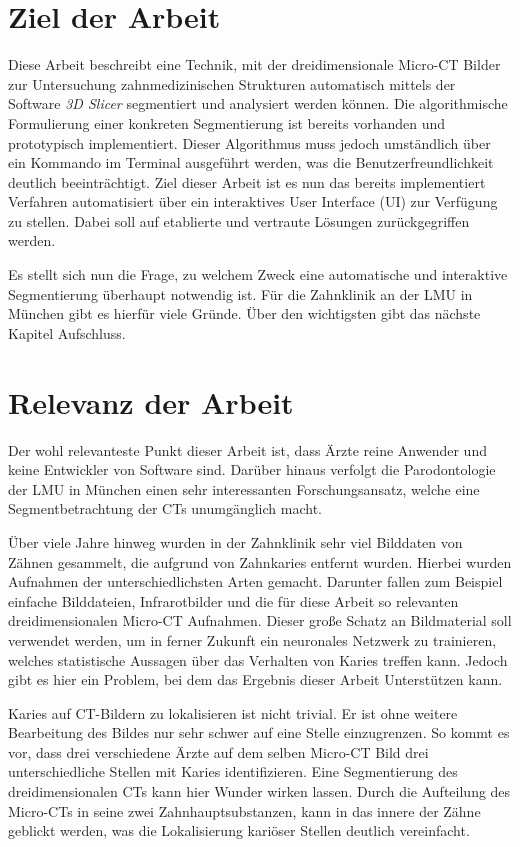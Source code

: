 \section{Ziel der Arbeit}
\label{sec:ziel_der_arbeit} Diese Arbeit beschreibt eine Technik, mit der
dreidimensionale Micro-CT Bilder zur Untersuchung zahnmedizinischen Strukturen
automatisch mittels der Software \textit{3D Slicer} segmentiert und analysiert werden
können. Die algorithmische Formulierung einer konkreten Segmentierung ist
bereits vorhanden und prototypisch implementiert. Dieser Algorithmus muss jedoch
umständlich über ein Kommando im Terminal ausgeführt werden, was die
Benutzerfreundlichkeit deutlich beeinträchtigt. Ziel dieser Arbeit ist es nun das
bereits implementiert Verfahren automatisiert über ein interaktives User Interface
(UI) zur Verfügung zu stellen. Dabei soll auf etablierte und vertraute Lösungen
zurückgegriffen werden.

Es stellt sich nun die Frage, zu welchem Zweck eine automatische und interaktive
Segmentierung überhaupt notwendig ist. Für die Zahnklinik an der LMU in München
gibt es hierfür viele Gründe. Über den wichtigsten gibt das nächste Kapitel Aufschluss.

\section{Relevanz der Arbeit}
\label{sec:relevanz_der_arbeit} Der wohl relevanteste Punkt dieser Arbeit ist,
dass Ärzte reine Anwender und keine Entwickler von Software sind. Darüber hinaus
verfolgt die Parodontologie der LMU in München einen sehr interessanten Forschungsansatz,
welche eine Segmentbetrachtung der CTs unumgänglich macht.

Über viele Jahre hinweg wurden in der Zahnklinik sehr viel Bilddaten von Zähnen
gesammelt, die aufgrund von Zahnkaries entfernt wurden. Hierbei wurden Aufnahmen
der unterschiedlichsten Arten gemacht. Darunter fallen zum Beispiel einfache Bilddateien,
Infrarotbilder und die für diese Arbeit so relevanten dreidimensionalen Micro-CT
Aufnahmen. Dieser große Schatz an Bildmaterial soll verwendet werden, um in
ferner Zukunft ein neuronales Netzwerk zu trainieren, welches statistische Aussagen
über das Verhalten von Karies treffen kann. Jedoch gibt es hier ein Problem, bei
dem das Ergebnis dieser Arbeit Unterstützen kann.

Karies auf CT-Bildern zu lokalisieren ist nicht trivial. Er ist ohne weitere
Bearbeitung des Bildes nur sehr schwer auf eine Stelle einzugrenzen. So kommt es
vor, dass drei verschiedene Ärzte auf dem selben Micro-CT Bild drei
unterschiedliche Stellen mit Karies identifizieren. Eine Segmentierung des dreidimensionalen
CTs kann hier Wunder wirken lassen. Durch die Aufteilung des Micro-CTs in seine
zwei Zahnhauptsubstanzen, kann in das innere der Zähne geblickt werden, was die
Lokalisierung kariöser Stellen deutlich vereinfacht.

